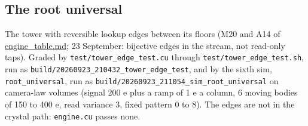 \subsection{\texorpdfstring{The root universal}{The root universal}}

The tower with reversible lookup edges between its floors (M20 and A14 of \hyperref[chap:engine-table]{engine\_\allowbreak{}table.md}; 23 September: bijective edges in the stream, not read-only taps). Graded by \texttt{test/\allowbreak{}tower\_\allowbreak{}edge\_\allowbreak{}test.\allowbreak{}cu} through \texttt{test/\allowbreak{}tower\_\allowbreak{}edge\_\allowbreak{}test.\allowbreak{}sh}, run as \texttt{build/\allowbreak{}20260923\_\allowbreak{}210432\_\allowbreak{}tower\_\allowbreak{}edge\_\allowbreak{}test}, and by the sixth sim, \texttt{root\_\allowbreak{}universal}, run as \texttt{build/\allowbreak{}20260923\_\allowbreak{}211054\_\allowbreak{}sim\_\allowbreak{}root\_\allowbreak{}universal} on camera-law volumes (signal 200 e plus a ramp of 1 e a column, 6 moving bodies of 150 to 400 e, read variance 3, fixed pattern 0 to 8). The edges are not in the crystal path: \texttt{engine.\allowbreak{}cu} passes none.

